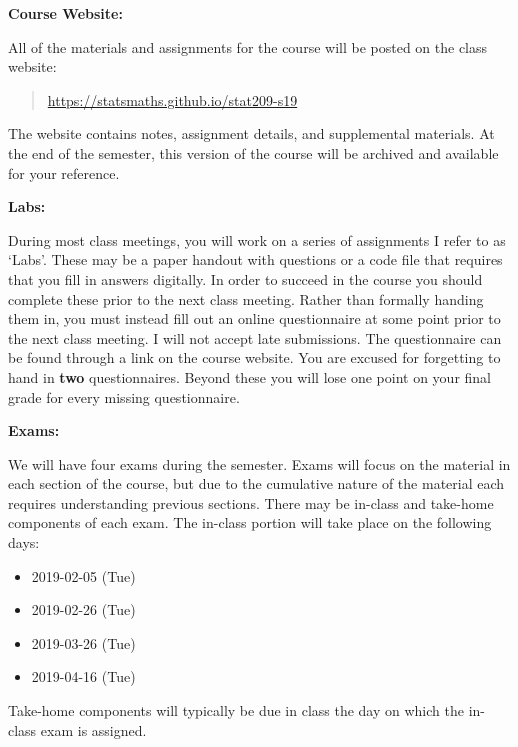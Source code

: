 \documentclass[12pt]{article}
\begin{document}
\bigskip

\textbf{Course Website:} \vspace{6pt}

All of the materials and assignments for the course will be posted
on the class website:
\begin{quote}
\url{https://statsmaths.github.io/stat209-s19}
\end{quote}
The website contains notes, assignment details, and supplemental materials.
At the end of the semester, this version of the course will be archived and
available for your reference.

\vspace{0.4cm}

\textbf{Labs:} \vspace{6pt}

During most class meetings, you will work on a series of assignments I refer
to as `Labs'. These may be a paper handout with questions or a code file that
requires that you fill in answers digitally. In order to succeed in the course
you should complete these prior to the next class meeting. Rather than
formally handing them in, you must instead fill out an online questionnaire
at some point prior to the next class meeting. I will not accept late
submissions. The questionnaire can be found through a link on the course
website. You are excused for forgetting to hand in \textbf{two}
questionnaires. Beyond these you will lose one point on your final grade for
every missing questionnaire.

\vspace{0.4cm}

\textbf{Exams:} \vspace{6pt}

We will have four exams during the semester. Exams will focus on
the material in each section of the course, but due to the cumulative nature
of the material each requires understanding previous sections. There may be
in-class and take-home components of each exam. The in-class portion will take
place on the following days:

\begin{itemize}\setlength\itemsep{0em}
\item 2019-02-05 (Tue)
\item 2019-02-26 (Tue)
\item 2019-03-26 (Tue)
\item 2019-04-16 (Tue)
\end{itemize}

Take-home components will typically be due in class the day on which the
in-class exam is assigned.
\end{document}
